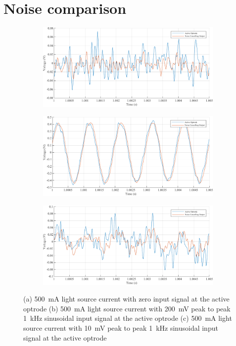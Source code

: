 \section{Noise comparison}


\begin{figure}
\centering
\begin{subfigure}{1\textwidth}
  \centering
  \includegraphics[scale = 0.8]{5-Experiment/500mA Signal_a.pdf}
  \caption{}
  \label{fig_500mA Signal_a}
\end{subfigure}
\begin{subfigure}{1\textwidth}
  \centering
  \includegraphics[scale = 0.8 ]{5-Experiment/500mA Signal_b.pdf}
  \caption{}
  \label{fig_500mA Signal_b}
\end{subfigure}
\begin{subfigure}{1\textwidth}
  \centering
  \includegraphics[scale = 0.8 ]{5-Experiment/500mA Signal_c.pdf}
  \caption{}
  \label{fig_500mA Signal_c}
\end{subfigure}
\caption{(a) \qty{500}{\mA} light source current with zero input signal at the active optrode (b) \qty{500}{\mA} light source current with \qty{200}{\mV} peak to peak \qty{1}{\kHz} sinusoidal input signal at the active optrode (c) \qty{500}{\mA} light source current with \qty{10}{\mV} peak to peak \qty{1}{\kHz} sinusoidal input signal at the active optrode}
\label{fig_500mA Signal}
\end{figure}

